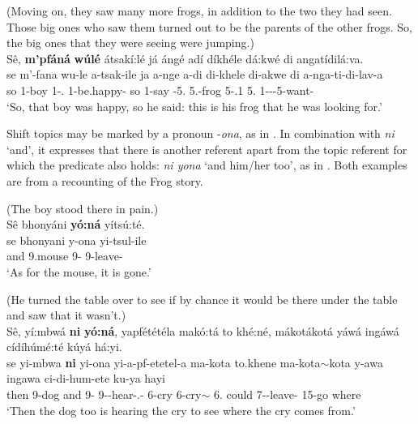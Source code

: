 \documentclass[output=paper]{langscibook}
\begin{document}
\ea
\label{bkm:Ref121991624}
(Moving on, they saw many more frogs, in addition to the two they had seen. Those big ones who saw them turned out to be the parents of the other frogs.  So, the big ones that they were seeing were jumping.)\\
Sê, \textbf{m’pfáná} \textbf{wúlé} átsakí:lé já ángé adí díkhéle dá:kwé di angatídilá:va.\\
\gll
se  m’-fana  wu-le  a-tsak-ile  ja  a-nge  a-di     di-khele  di-akwe  di  a-nga-ti-di-lav-a\\
so  1-boy  1-\DEM.\DIST{}  1\SM{}-be.happy-\PFV{}  so  1\SM{}-say  \AUG{}-5.\DEM{} 5.\COP-frog  5-\POSS.1  5.\DEM{}  1\SM{}-\REL{}-\IPFV{}-5\OM{}-want-\FV{}\\
\glt
‘So, that boy was happy, so he said: this is his frog that he was looking for.’

\z

Shift topics may be marked by a pronoun \mbox{-\textit{ona}}, as in . In combination with \textit{ni} ‘and’, it expresses that there is another referent apart from the topic referent for which the predicate also holds: \textit{ni yona} ‘and him/her too’, as in . Both examples are from a recounting of the Frog story.

\ea
\label{bkm:Ref121989506}
(The boy stood there in pain.)\\
Sê bhonyáni \textbf{yó:ná} yítsú:té.\\
\gll
se  bhonyani  y-ona  yi-tsul-ile\\
and  9.mouse  9-\PRO{}  9\SM{}-leave-\PFV{}\\
\glt
‘As for the mouse, it is gone.’\\

\z

\ea
\label{bkm:Ref121989699}
(He turned the table over to see if by chance it would be there under the table and saw that it wasn’t.)\\
Sê, yí:mbwá \textbf{ni} \textbf{yó:ná}, yapfététéla makó:tá to khé:né, mákotákotá yáwá ingáwá cídíhúmé:té kúyá há:yi. \\
\gll
se  yi-mbwa  \textbf{ni}  yi-ona  yi-a-pf-etetel-a  ma-kota  to.khene ma-kota$\sim$kota  y-awa  ingawa  ci-di-hum-ete  ku-ya  hayi \\
then  9-dog  and  9-\PRO{}  9\SM{}-\PRS{}-hear-\STAT.\APPL{}-\FV{}  6-cry  \COMP{} 6-cry$\sim$\RED{}  6.\DEM{}  could  7\SM{}-\DEP{}-leave-\PFV{}  15-go  where \\
\glt
‘Then the dog too is hearing the cry to see where the cry comes from.’\\
\end{document}
